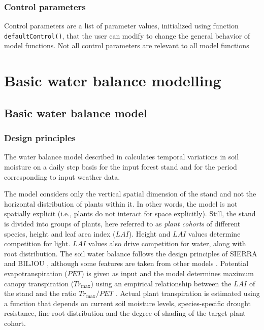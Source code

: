\documentclass[]{book}
\begin{document}
\section{Control parameters}\label{control-parameters}

Control parameters are a list of parameter values, initialized using
function \texttt{defaultControl()}, that the user can modify to change
the general behavior of model functions. Not all control parameters are
relevant to all model functions

\part{Basic water balance
modelling}\label{part-basic-water-balance-modelling}

\chapter{Basic water balance model}\label{basic-water-balance-model}

\section{Design principles}\label{design-principles}

The water balance model described in \citet{DeCaceres2015} calculates
temporal variations in soil moisture on a daily step basis for the input
forest stand and for the period corresponding to input weather data.

The model considers only the vertical spatial dimension of the stand and
not the horizontal distribution of plants within it. In other words, the
model is not spatially explicit (i.e., plants do not interact for space
explicitly). Still, the stand is divided into groups of plants, here
referred to as \emph{plant cohorts} of different species, height and
leaf area index (\(LAI\)). Height and \(LAI\) values determine
competition for light. \(LAI\) values also drive competition for water,
along with root distribution. The soil water balance follows the design
principles of SIERRA \citep{Mouillot2001, Ruffault2014, Ruffault2013}
and BILJOU \citetext{\citealp{Granier1999}; \citeyear{Granier2007}},
although some features are taken from other models \citep{Kergoat1998}.
Potential evapotranspiration (\(PET\)) is given as input and the model
determines maximum canopy transpiration (\(Tr_{\max}\)) using an
empirical relationship between the \(LAI\) of the stand and the ratio
\(Tr_{\max}/PET\) \citep{Granier1999}. Actual plant transpiration is
estimated using a function that depends on current soil moisture levels,
species-specific drought resistance, fine root distribution and the
degree of shading of the target plant cohort.
\end{document}
